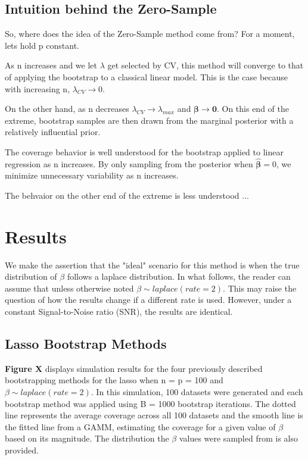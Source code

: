 \subsection{Intuition behind the Zero-Sample}

So, where does the idea of the Zero-Sample method come from? For a moment, lets hold p constant.

As n increases and we let $\lambda$ get selected by CV, this method will converge to that of applying the bootstrap to a classical linear model. This is the case because with increasing n, $\lambda_{CV} \rightarrow 0$.

On the other hand, as n decreases $\lambda_{CV} \rightarrow \lambda_{max}$ and $\boldsymbol{\beta} \rightarrow \boldsymbol{0}$. On this end of the extreme, bootstrap samples are then drawn from the marginal posterior with a relatively influential prior.

The coverage behavior is well understood for the bootstrap applied to linear regression as n increases. By only sampling from the posterior when $\boldsymbol{\hat{\beta}} = 0$, we minimize unnecessary variability as n increases.

The behvaior on the other end of the extreme is less understood ... 

\section{Results}

We make the assertion that the "ideal" scenario for this method is when the true distribution of $\beta$ follows a laplace distribution. In what follows, the reader can assume that unless otherwise noted $\beta \sim laplace(rate = 2)$. This may raise the question of how the results change if a different rate is used. However, under a constant Signal-to-Noise ratio (SNR), the results are identical.

\subsection{Lasso Bootstrap Methods}



\textbf{Figure X} displays simulation results for the four previously described bootstrapping methods for the lasso when n = p = 100 and $\beta \sim laplace(rate = 2)$. In this simulation, 100 datasets were generated and each bootstrap method was applied using B = 1000 bootstrap iterations. The dotted line represents the average coverage across all 100 datasets and the smooth line is the fitted line from a GAMM, estimating the coverage for a given value of $\beta$ based on its magnitude. The distribution the $\beta$ values were sampled from is also provided.

